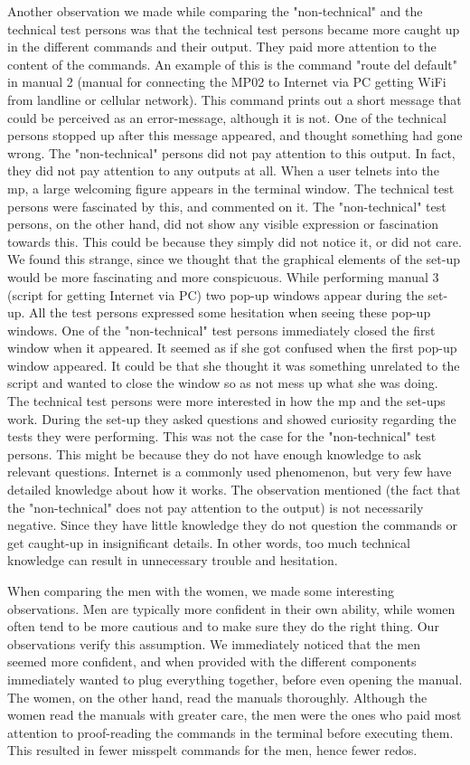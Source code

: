 Another observation we made while comparing the "non-technical" and the technical test persons was that the technical test persons became more caught up in the different commands and their output. They paid more attention to the content of the commands. An example of this is the command "route del default" in manual 2 (manual for connecting the MP02 to Internet via PC getting WiFi from landline or cellular network). This command prints out a short message that could be perceived as an error-message, although it is not. One of the technical persons stopped up after this message appeared, and thought something had gone wrong. The "non-technical" persons did not pay attention to this output. In fact, they did not pay attention to any outputs at all. When a user telnets into the \gls{mp}, a large welcoming figure appears in the terminal window. The technical test persons were fascinated by this, and commented on it. The "non-technical" test persons, on the other hand, did not show any visible expression or fascination towards this. This could be because they simply did not notice it, or did not care. We found this strange, since we thought that the graphical elements of the set-up would be more fascinating and more conspicuous. While performing manual 3 (script for getting Internet via PC) two pop-up windows appear during the set-up. All the test persons expressed some hesitation when seeing these pop-up windows. One of the "non-technical" test persons immediately closed the first window when it appeared. It seemed as if she got confused when the first pop-up window appeared. It could be that she thought it was something unrelated to the script and wanted to close the window so as not mess up what she was doing. The technical test persons were more interested in how the \gls{mp} and the set-ups work. During the set-up they asked questions and showed curiosity regarding the tests they were performing. This was not the case for the "non-technical" test persons. This might be because they do not have enough knowledge to ask relevant questions. Internet is a commonly used phenomenon, but very few have detailed knowledge about how it works. The observation mentioned (the fact that the "non-technical" does not pay attention to the output) is not necessarily negative. Since they have little knowledge they do not question the commands or get caught-up in insignificant details. In other words, too much technical knowledge can result in unnecessary trouble and hesitation. 

When comparing the men with the women, we made some interesting observations. Men are typically more confident in their own ability, while women often tend to be more cautious and to make sure they do the right thing. Our observations verify this assumption. We immediately noticed that the men seemed more confident, and when provided with the different components immediately wanted to plug everything together, before even opening the manual. The women, on the other hand, read the manuals thoroughly. Although the women read the manuals with greater care, the men were the ones who paid most attention to proof-reading the commands in the terminal before executing them. This resulted in fewer misspelt commands for the men, hence fewer redos. 

